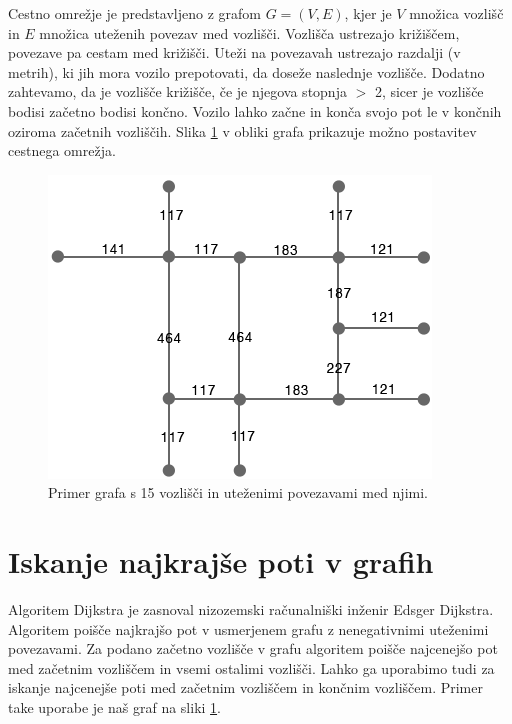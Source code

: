 \documentclass[a4paper, 12pt]{book}
\begin{document}
Cestno omre\v zje je predstavljeno z grafom $G = (V, E)$, kjer je $V$ mno\v zica vozli\v s\v c in $E$ mno\v zica ute\v zenih povezav med vozli\v s\v ci. Vozli\v s\v ca ustrezajo kri\v zi\v s\v cem, povezave pa cestam med kri\v zi\v s\v ci. Ute\v zi na povezavah ustrezajo razdalji (v metrih), ki jih mora vozilo prepotovati, da dose\v ze naslednje vozli\v s\v ce.  Dodatno zahtevamo, da je vozli\v s\v ce kri\v zi\v s\v ce, \v ce je njegova stopnja $>$ 2, sicer je vozli\v s\v ce bodisi za\v cetno bodisi kon\v cno. Vozilo lahko za\v cne in kon\v ca svojo pot le v kon\v cnih oziroma za\v cetnih vozli\v s\v cih. Slika \ref{graph3} v obliki grafa prikazuje mo\v zno postavitev cestnega omre\v zja.
\begin{figure}
\begin{center}
\includegraphics[scale=0.70]{graph3.png}
\end{center}
\caption{Primer grafa s 15 vozli\v s\v ci in ute\v zenimi povezavami med njimi.}
\label{graph3}
\end{figure}

\section{Iskanje najkraj\v se poti v grafih}
\label{seq:dijkstra}
Algoritem Dijkstra je zasnoval nizozemski ra\v cunalni\v ski in\v zenir Edsger Dijkstra. Algoritem poi\v s\v ce najkraj\v so pot v usmerjenem grafu z nenegativnimi ute\v zenimi povezavami. Za podano za\v cetno vozli\v s\v ce v grafu algoritem poi\v s\v ce najcenej\v so pot med za\v cetnim vozli\v s\v cem in vsemi ostalimi vozli\v s\v ci. Lahko ga uporabimo tudi za iskanje najcenej\v se poti med za\v cetnim vozli\v s\v cem in kon\v cnim vozli\v s\v cem. Primer take uporabe je na\v s graf na sliki \ref{graph3}.
\end{document}
